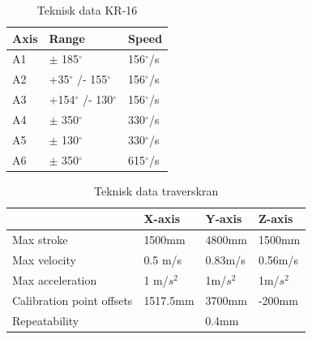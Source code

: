 \documentclass{article}
\begin{document}
\begin{table}[!htbp]
\centering
\begin{tabular}{l|l|l}
Axis & Range         & Speed   \\ \hline
A1   & $\pm$ 185$^{\circ}$        & 156$^{\circ}$/s \\
A2   & +35$^{\circ}$ /- 155$^{\circ}$  & 156$^{\circ}$/s \\
A3   & +154$^{\circ}$ /- 130$^{\circ}$ & 156$^{\circ}$/s \\
A4   & $\pm$ 350$^{\circ}$        & 330$^{\circ}$/s \\
A5   & $\pm$ 130$^{\circ}$        & 330$^{\circ}$/s \\
A6   & $\pm$ 350$^{\circ}$        & 615$^{\circ}$/s
\end{tabular}%
\caption{Teknisk data KR-16\cite{kuka:kr16}}
\label{tab:kr16_range}
\end{table}


\begin{table}[!htbp]
\centering
\begin{tabular}{l|l|l|l}
                          & \multicolumn{1}{l}{X-axis} & \multicolumn{1}{l}{Y-axis} & \multicolumn{1}{l}{Z-axis} \\ \hline
Max stroke                & 1500mm                     & 4800mm                     & 1500mm                     \\
Max velocity              & 0.5 m/s                    & 0.83m/s                    & 0.56m/s                    \\
Max acceleration          & 1 m/$s^2$                  & 1m/$s^2$                   & 1m/$s^2$                   \\
Calibration point offsets & 1517.5mm                   & 3700mm                     & -200mm                     \\
Repeatability             & \multicolumn{3}{c}{0.4mm}                                                           
\end{tabular}%
\caption{Teknisk data traverskran\cite{SINTEF:robotlab}}
\label{tab:gantry}
\end{table}
\end{document}
